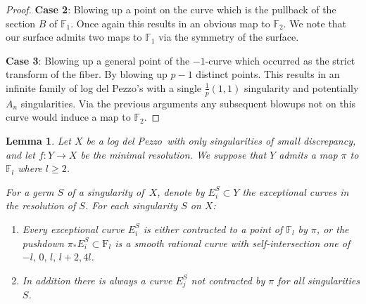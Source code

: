 \documentclass[12pt,a4paper]{book}      %
\newtheorem{lem}[thm]{Lemma}
\theoremstyle{definition}
\newcommand{\ldp}{log del Pezzo}
\newcommand{\mb}[1]{\mathbb{#1}}
\newcommand{\minres}{minimal resolution}
\newcommand{\F}{\mathrm{F}}
\begin{document}
\begin{proof}
\textbf{Case 2}: Blowing up a point on the curve which is the pullback of the section $B$ of $\mb{F}_1$. Once again this results in an obvious map to $\mb{F}_2$. We note that our surface admits two maps to $\mb{F}_1$ via the symmetry of the surface.


\textbf{Case 3}:
Blowing up a general point of the $-1$-curve which occurred as the strict transform of the fiber. By blowing up $p-1$ distinct points. This results in an infinite family of \ldp's with a single $\frac{1}{p}(1,1)$ singularity and potentially $A_n$ singularities.
Via the previous arguments any subsequent blowups not on this curve would induce a map to $\mb{F}_2$.
\end{proof}


\begin{lem}\label{HSlem}
Let $X$ be a \ldp\ with only singularities of small discrepancy, and
let $f \colon Y \rightarrow X$ be the \minres. We suppose that $Y$ admits a map $\pi$ to $\mb{F}_l$ where $l \geq 2$.

For a germ $S$ of a singularity of~$X$, denote by
$E_i^S \subset Y$ the exceptional curves in the resolution of $S$.
For each singularity $S$ on $X$:
\begin{enumerate}
\item
Every exceptional curve $E_i^S$ is either contracted to a point of $\mb{F}_l$ by $\pi$,
or the pushdown
$\pi_* E_i^S\subset\F_l$ is a smooth rational curve with self-intersection one of $-l, \,0, \, l, \, l+2, 4l $.
\item
In addition there is always a curve $E_j^S$ not contracted by $\pi$ for all singularities $S$.
\end{enumerate}

\end{lem}
\end{document}
